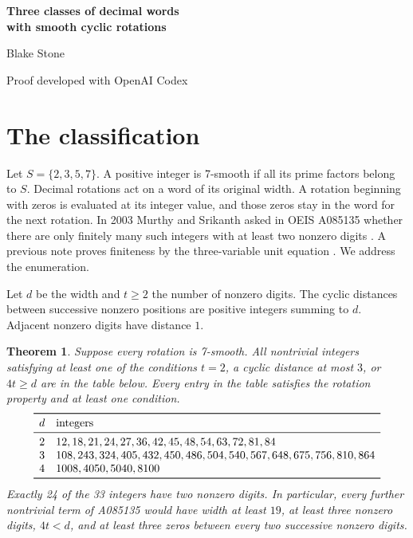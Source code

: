 \documentclass[11pt,letterpaper]{article}
\newtheorem{theorem}{Theorem}
\begin{document}
\begin{center}
{\LARGE\bfseries Three classes of decimal words\\[2pt] with smooth cyclic rotations}\par\medskip
Blake Stone\par{\small Proof developed with OpenAI Codex}
\end{center}
\begin{abstract}
We classify the decimal integers whose fixed-width cyclic rotations are all 7-smooth when there are exactly two nonzero digits, when two consecutive nonzero digits have cyclic distance at most three, or when at least one quarter of the digits are nonzero. The union contains precisely 33 nontrivial integers. The argument bounds the entire word length using two rotations and a published table of coprime sums. We also show that every positive 7-smooth decimal integer has full period as a word.
\end{abstract}

\section{The classification}
Let $S=\{2,3,5,7\}$. A positive integer is 7-smooth if all its prime factors belong to $S$. Decimal rotations act on a word of its original width. A rotation beginning with zeros is evaluated at its integer value, and those zeros stay in the word for the next rotation. In 2003 Murthy and Srikanth asked in OEIS A085135 whether there are only finitely many such integers with at least two nonzero digits \cite{oeis}. A previous note proves finiteness by the three-variable unit equation \cite{earlier}. We address the enumeration.

Let $d$ be the width and $t\ge2$ the number of nonzero digits. The cyclic distances between successive nonzero positions are positive integers summing to $d$. Adjacent nonzero digits have distance $1$.
\begin{theorem}\label{th:list}
Suppose every rotation is 7-smooth. All nontrivial integers satisfying at least one of the conditions $t=2$, a cyclic distance at most $3$, or $4t\ge d$ are in the table below. Every entry in the table satisfies the rotation property and at least one condition.
\[
\begin{array}{cl}
\toprule
d&\text{integers}\\
\midrule
2&12,18,21,24,27,36,42,45,48,54,63,72,81,84\\
3&108,243,324,405,432,450,486,504,540,567,648,675,756,810,864\\
4&1008,4050,5040,8100\\
\bottomrule
\end{array}
\]
Exactly 24 of the 33 integers have two nonzero digits. In particular, every further nontrivial term of A085135 would have width at least $19$, at least three nonzero digits, $4t<d$, and at least three zeros between every two successive nonzero digits.
\end{theorem}
\end{document}
